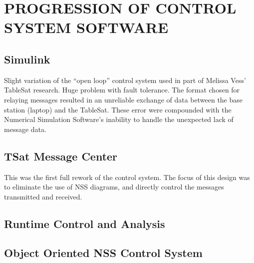 
\chapter{PROGRESSION OF CONTROL SYSTEM SOFTWARE}
\label{chap:ProgressionOfControlSystemSoftware}

\section{Simulink}
\label{sec:Simulink}

Slight variation of the ``open loop'' control system used in part of Melissa Vess' TableSat research.  Huge problem with fault tolerance.  The format chosen for relaying messages resulted in an unreliable exchange of data between the base station (laptop) and the TableSat.  These error were compounded with the Numerical Simulation Software's inability to handle the unexpected lack of message data.



\section{TSat Message Center}
\label{sec:TSatMessageCenter}

This was the first full rework of the control system.  The focus of this design was to eliminate the use of NSS diagrams, and directly control the messages transmitted and received.




\section{Runtime Control and Analysis}
\label{sec:RuntimeControlandAnalysis}


\section{Object Oriented NSS Control System}
\label{sec:ObjectOrientedNSSControlSystem}



